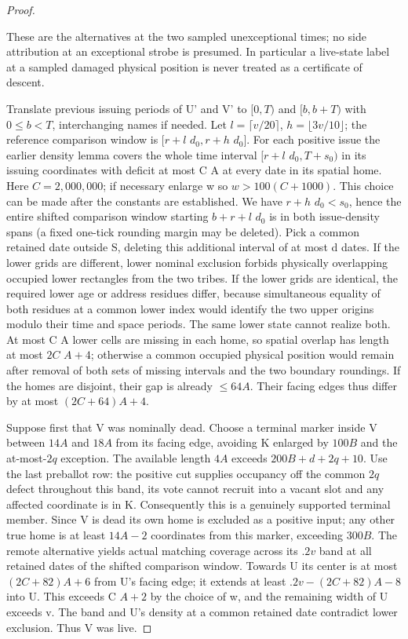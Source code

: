 \begin{proof}
\begin{enumerate}
\end{enumerate}

These are the alternatives at the two sampled unexceptional times; no side attribution at an exceptional strobe is presumed. In particular a live-state label at a sampled damaged physical position is never treated as a certificate of descent.



Translate previous issuing periods of U' and V' to \([0,T)\) and \([b,b+T)\) with \(0\le b<T\), interchanging names if needed. Let \(l=\lceil v/20 \rceil \), \(h=\lfloor 3v/10 \rfloor \); the reference comparison window is \([r+l\) \(d_0,r+h\) \(d_0]\). For each positive issue the earlier density lemma covers the whole time interval \([r+l\) \(d_0,T+s_0)\) in its issuing coordinates with deficit at most C A at every date in its spatial home. Here \(C=2{,}000{,}000\); if necessary enlarge w so \(w>100(C+1000)\). This choice can be made after the constants are established. We have \(r+h\) \(d_0<s_0\), hence the entire shifted comparison window starting \(b+r+l\) \(d_0\) is in both issue-density spans (a fixed one-tick rounding margin may be deleted). Pick a common retained date outside S, deleting this additional interval of at most d dates. If the lower grids are different, lower nominal exclusion forbids physically overlapping occupied lower rectangles from the two tribes. If the lower grids are identical, the required lower age or address residues differ, because simultaneous equality of both residues at a common lower index would identify the two upper origins modulo their time and space periods. The same lower state cannot realize both. At most C A lower cells are missing in each home, so spatial overlap has length at most \(2C\) \(A+4\); otherwise a common occupied physical position would remain after removal of both sets of missing intervals and the two boundary roundings. If the homes are disjoint, their gap is already \(\le\)\(64A\). Their facing edges thus differ by at most \((2C+64)A+4\).

Suppose first that V was nominally dead. Choose a terminal marker inside V between \(14A\) and \(18A\) from its facing edge, avoiding K enlarged by \(100B\) and the at-most-\(2q\) exception. The available length \(4A\) exceeds \(200B+d+2q+10\). Use the last preballot row: the positive cut supplies occupancy off the common \(2q\) defect throughout this band, its vote cannot recruit into a vacant slot and any affected coordinate is in K. Consequently this is a genuinely supported terminal member. Since V is dead its own home is excluded as a positive input; any other true home is at least \(14A- 2\) coordinates from this marker, exceeding \(300B\). The remote alternative yields actual matching coverage across its \(.2v\) band at all retained dates of the shifted comparison window. Towards U its center is at most \((2C+82)A+6\) from U's facing edge; it extends at least \(.2v- (2C+82)A- 8\) into U. This exceeds C \(A+2\) by the choice of w, and the remaining width of U exceeds v. The band and U's density at a common retained date contradict lower exclusion. Thus V was live.


\end{proof}
